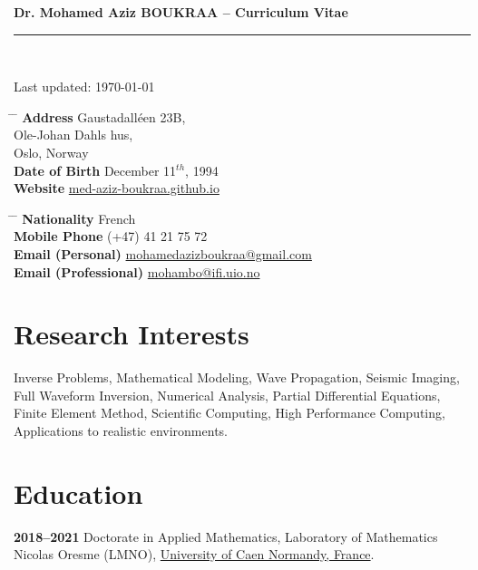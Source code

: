 \documentclass[10pt]{article}
\renewcommand{\title}[1]{%
{\LARGE\color{slateblue}\textbf{#1}}\\[2pt]
\rule{\textwidth}{0.5mm}\\
}
\begin{document}
\title{Dr. Mohamed Aziz BOUKRAA -- Curriculum Vitae}
{\raggedleft\small Last updated: \today\par}

\parbox{0.5\textwidth}{
\begin{tabbing}
\hspace{2.5cm} \= \hspace{4cm} \= \kill
{\bf Address} \> Gaustadalléen 23B,\\
\> Ole-Johan Dahls hus,\\
 Oslo, Norway \\
{\bf Date of Birth} \> December 11$^{th}$, 1994 \\
{\bf Website} \> \href{https://med-aziz-boukraa.github.io/}{med-aziz-boukraa.github.io}
\end{tabbing}}
\hspace{0.5cm}
\parbox{0.5\textwidth}{
\begin{tabbing}
\hspace{3.5cm} \= \hspace{4cm} \= \kill
{\bf Nationality} \> French \\
{\bf Mobile Phone} \> (+47) 41 21 75 72 \\
{\bf Email (Personal)} \> \href{mailto:mohamedazizboukraa@gmail.com}{mohamedazizboukraa@gmail.com} \\
{\bf Email (Professional)} \> \href{mailto:mohambo@ifi.uio.no}{mohambo@ifi.uio.no}
\end{tabbing}}

\section{Research Interests}
Inverse Problems, Mathematical Modeling, Wave Propagation, Seismic Imaging, Full Waveform Inversion, Numerical Analysis, Partial Differential Equations, Finite Element Method, Scientific Computing, High Performance Computing, Applications to realistic environments.


\section{Education}

\textbf{2018--2021} \quad Doctorate in Applied Mathematics, Laboratory of Mathematics Nicolas Oresme (LMNO), \href{http://www.unicaen.fr/}{University of Caen Normandy, France}.  
\end{document}
